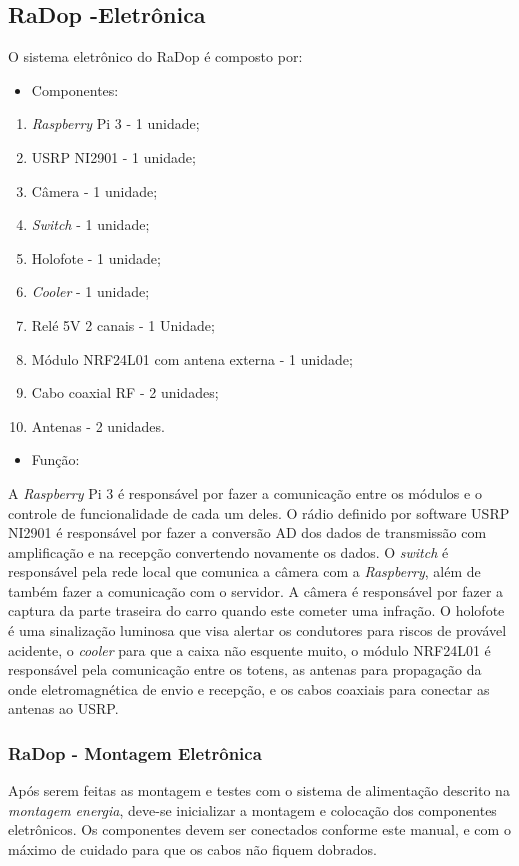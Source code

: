 \subsection{RaDop -Eletrônica}
O sistema eletrônico do RaDop é composto por:

\begin{itemize}
         \item Componentes:
         \end{itemize}
         \begin{enumerate}
    \item \emph{Raspberry} Pi 3 - 1 unidade; 
    \item USRP NI2901 - 1 unidade;
    \item Câmera - 1 unidade;
    \item \emph{Switch} - 1 unidade;
    \item Holofote - 1 unidade;
    \item \emph{Cooler} - 1 unidade;
    \item Relé 5V 2 canais - 1 Unidade;
    \item Módulo NRF24L01 com antena externa - 1 unidade;
    \item Cabo coaxial RF - 2 unidades;
    \item Antenas - 2 unidades.
    \end{enumerate}

\begin{itemize}
       \item Função:
\end{itemize}

A \emph{Raspberry} Pi 3 é responsável por fazer a comunicação entre os módulos e o controle de funcionalidade de cada um deles. O rádio definido por software USRP NI2901 é responsável por fazer a conversão AD dos dados de transmissão com amplificação e na recepção convertendo novamente os dados.  O \emph{switch} é responsável pela rede local que comunica a câmera com a \emph{Raspberry}, além de também fazer a comunicação com o servidor. A câmera é responsável por fazer a captura da parte traseira do carro quando este cometer uma infração. O holofote é uma sinalização luminosa que visa alertar os condutores para riscos de provável acidente, o \emph{cooler} para que a caixa não esquente muito, o módulo NRF24L01 é responsável pela comunicação entre os totens, as antenas para propagação da onde eletromagnética de envio e recepção, e os cabos coaxiais para conectar as antenas ao USRP.

  \subsubsection{RaDop - Montagem Eletrônica}
  Após serem feitas as montagem e testes com o sistema de alimentação descrito na \emph{montagem energia}, deve-se inicializar a montagem e colocação dos componentes eletrônicos. Os componentes devem ser conectados conforme este manual, e com o máximo de cuidado para que os cabos não fiquem dobrados.
  
